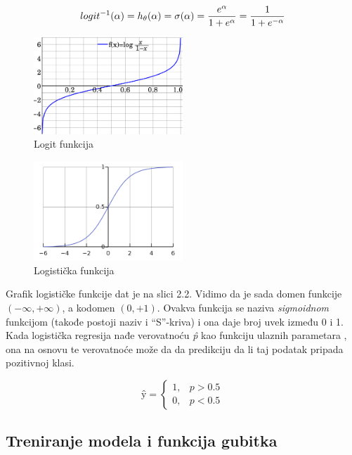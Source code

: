 \documentclass[a4paper,12pt]{report}
\begin{document}
\begin{equation}\label{eq:hypothesis}
 logit^{-1}(\alpha) = h\textsubscript{$\theta$}(\alpha) = \sigma(\alpha) = \frac{e^\alpha}{1+e^\alpha} =\frac{1}{1+e^{- \alpha}}
\end{equation}
\begin{figure}
    \centering
    \includegraphics[width=0.5\textwidth]{logit.png}
    \caption{Logit funkcija}\label{fig:prettypic}
\end{figure}
\begin{figure}
    \centering
    \includegraphics[width=0.5\textwidth]{logistic.png}
    \caption{Logistička funkcija}\label{fig:prettypic}
\end{figure}

Grafik logističke funkcije dat je na slici 2.2. Vidimo da je sada domen funkcije $ (-\infty, +\infty) $, a kodomen $ (0, +1) $. Ovakva funkcija se naziva \textit{sigmoidnom} funkcijom (takođe postoji naziv i \enquote{S}-kriva) i ona daje broj uvek između 0 i 1. \\
Kada logistička regresija nađe verovatnoću \textit{\^{p}} kao funkciju ulaznih parametara , ona na osnovu te verovatnoće može da da predikciju da li taj podatak pripada pozitivnoj klasi. 

\begin{equation}
  \textit{\^{y}} =
  \begin{cases}
    1, & \textit{\^{p}} > 0.5 \\
    0, & \textit{\^{p}} < 0.5
  \end{cases}
\end{equation}

\subsection{Treniranje modela i funkcija gubitka}
\end{document}
